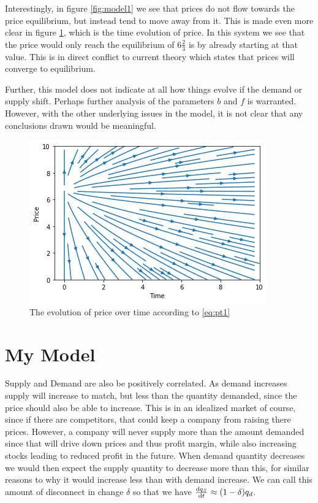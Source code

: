 \documentclass{article}
\begin{document}
Interestingly, in figure \ref{fig:model1} we see that prices do not flow towards the price equilibrium, but instead tend to move away from it. This is made even more clear in figure \ref{fig:model1_time_price}, which is the time evolution of price. In this system we see that the price would only reach the equilibrium of $6 \frac{2}{3}$ is by already starting at that value. This is in direct conflict to current theory which states that prices will converge to equilibrium. 

Further, this model does not indicate at all how things evolve if the demand or supply shift. Perhaps further analysis of the parameters $b$ and $f$ is warranted. However, with the other underlying issues in the model, it is not clear that any conclusions drawn would be meaningful. 

	\begin{figure}
		\centering
			\includegraphics[width = 0.6\columnwidth]{Figures/simple_priceOverTime.png}
		\caption{The evolution of price over time according to \eqref{eq:pt1}}
		\label{fig:model1_time_price} 
	\end{figure}



\section{My Model}

Supply and Demand are also be positively correlated. As demand increases supply will increase to match, but less than the quantity demanded, since the price should also be able to increase. This is in an idealized market of course, since if there are competitors, that could keep a company from raising there prices. However, a company will never supply more than the amount demanded since that will drive down prices and thus profit margin, while also increasing stocks leading to reduced profit in the future. When demand quantity decreases we would then expect the supply quantity to decrease more than this, for similar reasons to why it would increase less than with demand increase. We can call this amount of disconnect in change $\delta$ so that we have $\frac{\mathrm{d} q_S}{\mathrm{d} t} \approx (1-\delta)q_d$.
\end{document}
